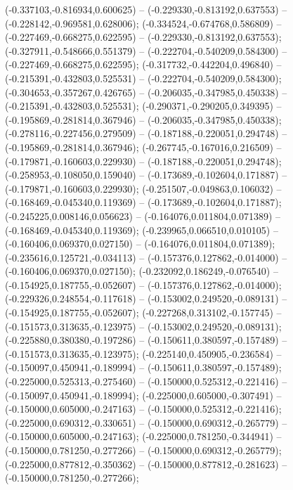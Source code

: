  (-0.337103,-0.816934,0.600625) -- (-0.229330,-0.813192,0.637553) -- (-0.228142,-0.969581,0.628006);
 (-0.334524,-0.674768,0.586809) -- (-0.227469,-0.668275,0.622595) -- (-0.229330,-0.813192,0.637553);
 (-0.327911,-0.548666,0.551379) -- (-0.222704,-0.540209,0.584300) -- (-0.227469,-0.668275,0.622595);
 (-0.317732,-0.442204,0.496840) -- (-0.215391,-0.432803,0.525531) -- (-0.222704,-0.540209,0.584300);
 (-0.304653,-0.357267,0.426765) -- (-0.206035,-0.347985,0.450338) -- (-0.215391,-0.432803,0.525531);
 (-0.290371,-0.290205,0.349395) -- (-0.195869,-0.281814,0.367946) -- (-0.206035,-0.347985,0.450338);
 (-0.278116,-0.227456,0.279509) -- (-0.187188,-0.220051,0.294748) -- (-0.195869,-0.281814,0.367946);
 (-0.267745,-0.167016,0.216509) -- (-0.179871,-0.160603,0.229930) -- (-0.187188,-0.220051,0.294748);
 (-0.258953,-0.108050,0.159040) -- (-0.173689,-0.102604,0.171887) -- (-0.179871,-0.160603,0.229930);
 (-0.251507,-0.049863,0.106032) -- (-0.168469,-0.045340,0.119369) -- (-0.173689,-0.102604,0.171887);
 (-0.245225,0.008146,0.056623) -- (-0.164076,0.011804,0.071389) -- (-0.168469,-0.045340,0.119369);
 (-0.239965,0.066510,0.010105) -- (-0.160406,0.069370,0.027150) -- (-0.164076,0.011804,0.071389);
 (-0.235616,0.125721,-0.034113) -- (-0.157376,0.127862,-0.014000) -- (-0.160406,0.069370,0.027150);
 (-0.232092,0.186249,-0.076540) -- (-0.154925,0.187755,-0.052607) -- (-0.157376,0.127862,-0.014000);
 (-0.229326,0.248554,-0.117618) -- (-0.153002,0.249520,-0.089131) -- (-0.154925,0.187755,-0.052607);
 (-0.227268,0.313102,-0.157745) -- (-0.151573,0.313635,-0.123975) -- (-0.153002,0.249520,-0.089131);
 (-0.225880,0.380380,-0.197286) -- (-0.150611,0.380597,-0.157489) -- (-0.151573,0.313635,-0.123975);
 (-0.225140,0.450905,-0.236584) -- (-0.150097,0.450941,-0.189994) -- (-0.150611,0.380597,-0.157489);
 (-0.225000,0.525313,-0.275460) -- (-0.150000,0.525312,-0.221416) -- (-0.150097,0.450941,-0.189994);
 (-0.225000,0.605000,-0.307491) -- (-0.150000,0.605000,-0.247163) -- (-0.150000,0.525312,-0.221416);
 (-0.225000,0.690312,-0.330651) -- (-0.150000,0.690312,-0.265779) -- (-0.150000,0.605000,-0.247163);
 (-0.225000,0.781250,-0.344941) -- (-0.150000,0.781250,-0.277266) -- (-0.150000,0.690312,-0.265779);
 (-0.225000,0.877812,-0.350362) -- (-0.150000,0.877812,-0.281623) -- (-0.150000,0.781250,-0.277266);
